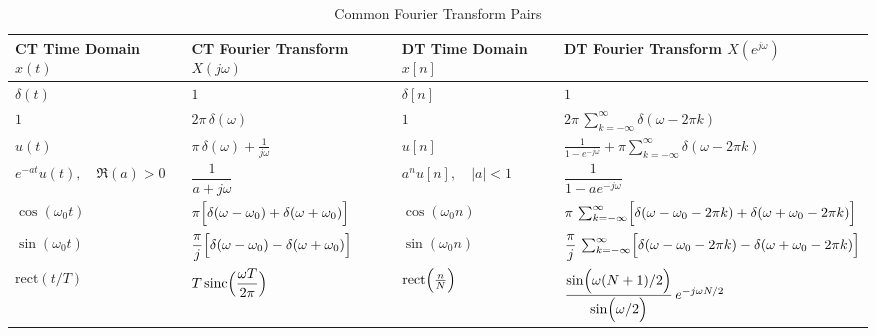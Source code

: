 \documentclass[8pt]{article}
\begin{document}
\begin{multicols}{2}
    \begin{table*}[ht]
        \centering
        \caption{Common Fourier Transform Pairs}
        \label{tab:common_fourier_transforms}
        \small
        \begin{tabular}{@{}llll@{}}
            \toprule
            \textbf{CT Time Domain} $x(t)$ & \textbf{CT Fourier Transform} $X(j\omega)$                                    & \textbf{DT Time Domain} $x[n]$         & \textbf{DT Fourier Transform} $X(e^{j\omega})$                                                                         \\
            \midrule
            $\delta(t)$                    & $1$                                                                           & $\delta[n]$                            & $1$                                                                                                                    \\ [1mm]
            $1$                            & $2\pi\,\delta(\omega)$                                                        & $1$                                    & $2\pi\,\sum_{k=-\infty}^{\infty}\delta(\omega-2\pi k)$                                                                 \\ [1mm]
            $u(t)$                         & $\pi\,\delta(\omega) + \frac{1}{j\omega}$                                     & $u[n]$                                 & $\frac{1}{1-e^{-j\omega}} + \pi \sum_{k=-\infty}^{\infty} \delta(\omega - 2\pi k)$                                     \\ [1mm] %
            $e^{-at}u(t),\quad \Re(a)>0$   & $\dfrac{1}{a+j\omega}$                                                        & $a^n u[n],\quad |a|<1$                 & $\dfrac{1}{1-ae^{-j\omega}}$                                                                                           \\ [1mm]
            $\cos(\omega_0 t)$             & $\pi\Bigl[\delta(\omega-\omega_0) + \delta(\omega+\omega_0)\Bigr]$            & $\cos(\omega_0 n)$                     & $\pi\,\sum_{k=-\infty}^{\infty}\Bigl[\delta(\omega-\omega_0-2\pi k) + \delta(\omega+\omega_0-2\pi k)\Bigr]$            \\ [1mm]
            $\sin(\omega_0 t)$             & $\dfrac{\pi}{j}\Bigl[\delta(\omega-\omega_0) - \delta(\omega+\omega_0)\Bigr]$ & $\sin(\omega_0 n)$                     & $\dfrac{\pi}{j}\,\sum_{k=-\infty}^{\infty}\Bigl[\delta(\omega-\omega_0-2\pi k) - \delta(\omega+\omega_0-2\pi k)\Bigr]$ \\ [1mm]
            $\mathrm{rect}(t/T)$           & $T\,\mathrm{sinc}\Bigl(\dfrac{\omega T}{2\pi}\Bigr)$                          & $\mathrm{rect}\Bigl(\frac{n}{N}\Bigr)$ & $\dfrac{\sin\Bigl(\omega (N+1)/2\Bigr)}{\sin\Bigl(\omega/2\Bigr)}\,e^{-j\omega N/2}$                                   \\ [1mm] %
            \bottomrule
        \end{tabular}
    \end{table*}

\end{multicols}
\end{document}
